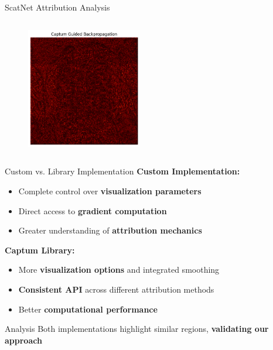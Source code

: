 \documentclass[aspectratio=169,8pt]{beamer}  %
\begin{document}
\begin{frame}{ScatNet Attribution Analysis}
\begin{columns}[T]
\begin{column}{0.5\textwidth}
\begin{figure}
\vspace{0.2cm}
\includegraphics[width=0.45\textwidth]{imgs/scatnet_gbp_captum.png}
\end{figure}
\end{column}
\end{columns}
\end{frame}

\begin{frame}{Custom vs. Library Implementation}
\textbf{Custom Implementation:}
\begin{itemize}
\item Complete control over \textbf{visualization parameters}
\item Direct access to \textbf{gradient computation}
\item Greater understanding of \textbf{attribution mechanics}
\end{itemize}

\textbf{Captum Library:}
\begin{itemize}
\item More \textbf{visualization options} and integrated smoothing
\item \textbf{Consistent API} across different attribution methods
\item Better \textbf{computational performance}
\end{itemize}

\begin{block}{Analysis}
Both implementations highlight similar regions, \textbf{validating our approach}
\end{block}
\end{frame}
\end{document}
